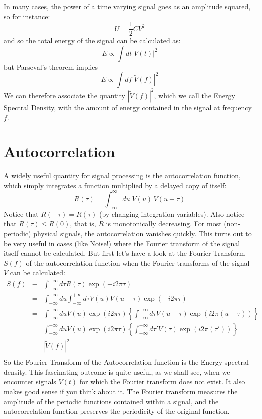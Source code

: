 \documentclass[12pt]{article}
\begin{document}
In many cases, the power of a time varying signal goes as an amplitude squared, so for instance:
\begin{displaymath}
U = \frac{1}{2} C V^2
\end{displaymath}
and so the total energy of the signal can be calculated as:
\begin{equation}
E \propto \int dt |V(t)|^2 \label{eqn:energy}
\end{equation}
but Parseval's theorem implies
\begin{displaymath}
E \propto \int df |\widetilde{V}(f)|^2
\end{displaymath}
We can therefore associate the quantity $|\widetilde{V}(f)|^2$, which we call the Energy Spectral Density, with the amount of energy contained in the signal at frequency $f$.

\section{Autocorrelation}

A widely useful quantity for signal processing is the autocorrelation function, which simply integrates a function multiplied by a delayed copy of itself:
\begin{equation}
R(\tau) = \int^{\infty}_{-\infty} du \; V(u) \, V(u+\tau) \label{eqn:auto}
\end{equation}
Notice that $R(-\tau) = R(\tau)$ (by changing integration variables).  Also notice that $R(\tau) \leq R(0)$, that is, $R$ is monotonically decreasing.  For most (non-periodic) physical signals, the autocorrelation vanishes quickly.  This turns out to be very useful in cases (like Noise!) where the Fourier transform of the signal itself cannot be calculated.  But first let's have a look at the Fourier Transform $S(f)$ of the autocorrelation function when the Fourier transforms of the signal $V$ can be calculated:
\begin{eqnarray*}
S(f) &\equiv&  \int_{-\infty}^{+\infty} d\tau R(\tau) \exp(-i2\pi \tau) \\
&=& \int_{-\infty}^{+\infty} du \int_{-\infty}^{+\infty} d\tau V(u) V(u-\tau) \exp(-i2\pi \tau) \\
&=& \int_{-\infty}^{+\infty} du V(u) \exp(i2\pi \tau) \left\{ \int_{-\infty}^{+\infty} d\tau V(u-\tau) \exp(i2\pi(u-\tau)) \right\}\\
&=& \int_{-\infty}^{+\infty} du V(u) \exp(i2\pi \tau) \left\{ \int_{-\infty}^{+\infty} d\tau' V(\tau) \exp(i2\pi(\tau')) \right\}\\
&=& | \widetilde{V}(f) |^2\\
\end{eqnarray*}
So the Fourier Transform of the Autocorrelation function is the Energy spectral density.  This fascinating outcome is quite useful, as we shall see, when we encounter signals $V(t)$ for which the Fourier transform does not exist.   It also makes good sense if you think about it.  The Fourier transform measures the amplitude of the periodic functions contained within a signal, and the autocorrelation function preserves the periodicity of the original function. 
\end{document}
